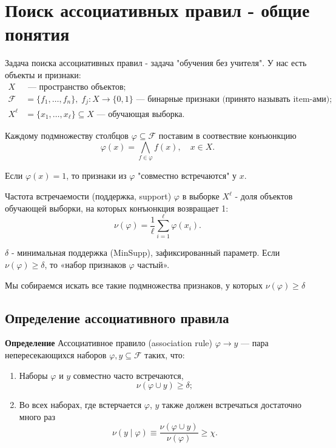 \section{Поиск ассоциативных правил - общие понятия}
Задача поиска ассоциативных правил - задача "обучения без учителя". У нас есть объекты и признаки:
\begin{align*}
    X           & \text{ — пространство объектов;}                                                                                \\
    \mathcal{F} & = \{f_1, \ldots, f_n\}, \; f_j: X \rightarrow \{0, 1\} \text{ — бинарные признаки (принято называть item-ами);} \\
    X^\ell      & = \{x_1, \ldots, x_\ell\} \subseteq X \text{ — обучающая выборка.}
\end{align*}

Каждому подмножеству столбцов $\varphi \subseteq \mathcal{F}$ поставим в соотвествие конъюнкцию
\[
    \varphi(x) = \bigwedge_{f \in \varphi} f(x), \quad x \in X.
\]

Если $\varphi(x) = 1$, то признаки из $\varphi$ "совместно встречаются" у $x$.

Частота встречаемости (поддержка, support) $\varphi$ в выборке $X^\ell$ - доля объектов обучающей выборки, на которых конъюнкция возвращает 1:
\[
    \nu(\varphi) = \frac{1}{\ell} \sum_{i=1}^\ell \varphi(x_i).
\]

$\delta$ - минимальная поддержка (MinSupp), зафиксированный параметр. Если $\nu(\varphi) \geq \delta$, то «набор признаков $\varphi$ частый».

Мы собираемся искать все такие подмножества признаков, у которых $\nu(\varphi) \geq \delta$
\newline

\subsection{Определение ассоциативного правила}
\textbf{Определение}
Ассоциативное правило (association rule) $\varphi \rightarrow y$ — пара непересекающихся наборов $\varphi, y \subseteq \mathcal{F}$ таких, что:
\begin{enumerate}
    \item Наборы $\varphi$ и $y$ совместно часто встречаются,
          \[
              \nu(\varphi \cup y) \geq \delta;
          \]
    \item Во всех наборах, где встерчается $\varphi$, $y$ также должен встречаться достаточно много раз
          \[
              \nu(y \mid \varphi) \equiv \frac{\nu(\varphi \cup y)}{\nu(\varphi)} \geq \chi.
          \]


\end{enumerate}

